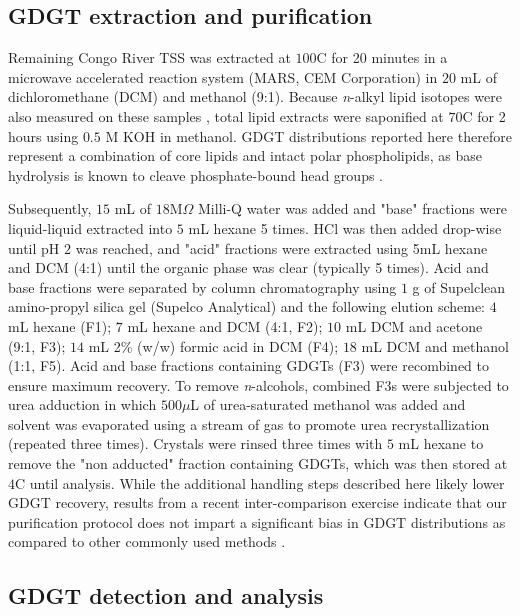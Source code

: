 \subsection{GDGT extraction and purification}

Remaining Congo River TSS was extracted at $100$\textdegree C for 20 minutes in a microwave accelerated reaction system (MARS, CEM Corporation) in $20$ mL of dichloromethane (DCM) and methanol (9:1). Because \textit{n}-alkyl lipid isotopes were also measured on these samples \citep{Hemingway:2016bq}, total lipid extracts were saponified at $70$\textdegree C for 2 hours using $0.5$ M KOH in methanol. GDGT distributions reported here therefore represent a combination of core lipids and intact polar phospholipids, as base hydrolysis is known to cleave phosphate-bound head groups \citep{Weijers:2011bn}.

Subsequently, $15$ mL of $18$M$\Omega$ Milli-Q water was added and "base" fractions were liquid-liquid extracted into $5$ mL hexane 5 times. HCl was then added drop-wise until pH $2$ was reached, and "acid" fractions were extracted using 5mL hexane and DCM (4:1) until the organic phase was clear (typically 5 times). Acid and base fractions were separated by column chromatography using $1$ g of Supelclean amino-propyl silica gel (Supelco Analytical) and the following elution scheme: $4$ mL hexane (F1); $7$ mL hexane and DCM (4:1, F2); $10$ mL DCM and acetone (9:1, F3); $14$ mL 2\% (w/w) formic acid in DCM (F4); $18$ mL DCM and methanol (1:1, F5). Acid and base fractions containing GDGTs (F3) were recombined to ensure maximum recovery. To remove \textit{n}-alcohols, combined F3s were subjected to urea adduction in which $500 \mu$L of urea-saturated methanol was added and solvent was evaporated using a stream of  gas to promote urea recrystallization (repeated three times). Crystals were rinsed three times with $5$ mL hexane to remove the "non adducted" fraction containing GDGTs, which was then stored at $4$\textdegree C until analysis. While the additional handling steps described here likely lower GDGT recovery, results from a recent inter-comparison exercise \citep{Schouten:2013hh} indicate that our purification protocol does not impart a significant bias in GDGT distributions as compared to other commonly used methods \citep[\textit{e.g.} the modified Bligh and Dyer method of][]{Pitcher:2009jd}.

\subsection{GDGT detection and analysis}

